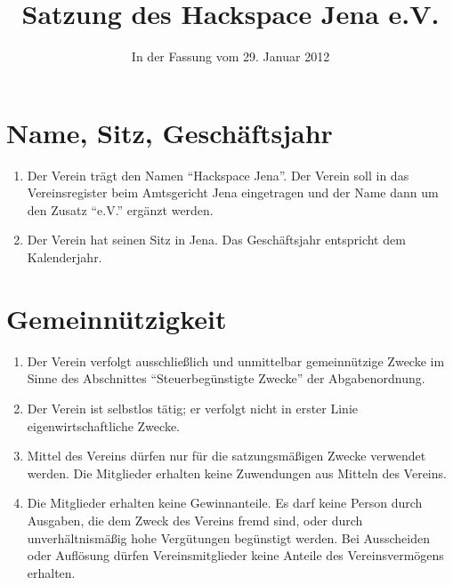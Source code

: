 \documentclass[fontsize=12pt,paper=a4,pagesize,headings=small]{scrartcl}
\title{Satzung des Hackspace Jena e.V.}
\date{In der Fassung vom 29. Januar 2012}
\begin{document}
\maketitle{}


\section{Name, Sitz, Geschäftsjahr}

\begin{enumerate}
	\item Der Verein trägt den Namen "`Hackspace Jena"'. Der Verein soll in
		das Vereinsregister beim Amtsgericht Jena eingetragen und der Name
		dann um den Zusatz "`e.V."' ergänzt werden.
	\item Der Verein hat seinen Sitz in Jena. Das Geschäftsjahr entspricht
		dem Kalenderjahr.
\end{enumerate}

\section{Gemeinnützigkeit}

\begin{enumerate}
	\item Der Verein verfolgt ausschließlich und unmittelbar gemeinnützige
		Zwecke im Sinne des Abschnittes "`Steuerbegünstigte Zwecke"' der
		Abgabenordnung.
	\item Der Verein ist selbstlos tätig; er verfolgt nicht in erster Linie
		eigenwirtschaftliche Zwecke.
	\item Mittel des Vereins dürfen nur für die satzungsmäßigen Zwecke
		verwendet werden. Die Mitglieder erhalten keine Zuwendungen aus
		Mitteln des Vereins.
	\item Die Mitglieder erhalten keine Gewinnanteile. Es darf keine Person
		durch Ausgaben, die dem Zweck des Vereins fremd sind, oder durch
		unverhältnismäßig hohe Vergütungen begünstigt werden. Bei
		Ausscheiden oder Auflösung dürfen Vereinsmitglieder keine Anteile
		des Vereinsvermögens erhalten.
\end{enumerate}

\newpage
\end{document}
